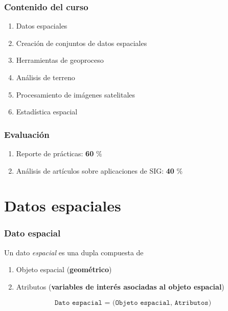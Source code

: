 \documentclass{beamer}
\begin{document}
\begin{frame}
	\frametitle{Contenido del curso}

	\begin{enumerate}
		\item{Datos espaciales}
		\item{Creación de conjuntos de datos espaciales}
		\item{Herramientas de geoproceso}
		\item{Análisis de terreno}
		\item{Procesamiento de imágenes satelitales}
		\item{Estadística espacial}
	\end{enumerate}			
	
\end{frame}

\begin{frame}
	\frametitle{Evaluación }

	\begin{enumerate}
		\item{Reporte de prácticas: \textbf{60} $\%$}
		\item{Análisis de artículos sobre aplicaciones de SIG: \textbf{40} $\%$}
	\end{enumerate}			
	
\end{frame}



\section{Datos espaciales}

\begin{frame}
	\frametitle{Dato espacial}
	Un dato \textit{espacial} es una dupla compuesta de 
	
	\begin{enumerate}
		\item{Objeto espacial (\textbf{geométrico})}
		\item{Atributos (\textbf{variables de interés asociadas al objeto espacial})}
	\end{enumerate}
	
	$$\texttt{Dato espacial = (Objeto espacial, Atributos)}$$
		
\end{frame}
\end{document}
